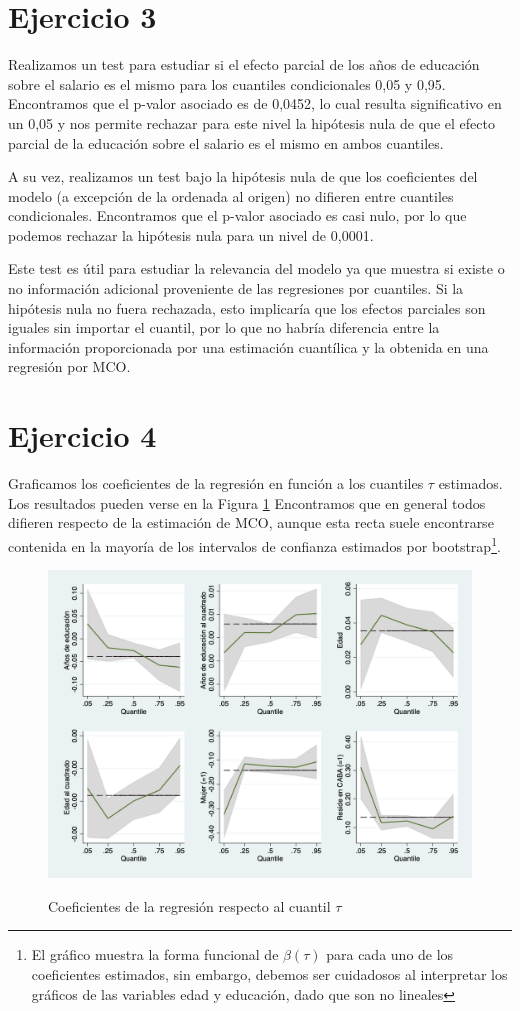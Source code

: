 \documentclass[11pt]{article}
\begin{document}
\section*{Ejercicio 3}

Realizamos un test para estudiar si el efecto parcial de los años de educación sobre el salario es el mismo para los cuantiles condicionales 0,05 y 0,95. Encontramos que el p-valor asociado es de 0,0452, lo cual resulta significativo en un 0,05 y nos permite rechazar para este nivel la hipótesis nula de que el efecto parcial de la educación sobre el salario es el mismo en ambos cuantiles.

A su vez, realizamos un test bajo la hipótesis nula de que los coeficientes del modelo (a excepción de la ordenada al origen) no difieren entre cuantiles condicionales. Encontramos que el p-valor asociado es casi nulo, por lo que podemos rechazar la hipótesis nula para un nivel de 0,0001. 

Este test es útil para estudiar la relevancia del modelo ya que muestra si existe o no información adicional proveniente de las regresiones por cuantiles. Si la hipótesis nula no fuera rechazada, esto implicaría que los efectos parciales son iguales sin importar el cuantil, por lo que no habría diferencia entre la información proporcionada por una estimación cuantílica y la obtenida en una regresión por MCO.

\section*{Ejercicio 4}

Graficamos los coeficientes de la regresión en función a los cuantiles $\tau$ estimados. Los resultados pueden verse en la Figura \ref{fig: 4} Encontramos que en general todos difieren respecto de la estimación de MCO, aunque esta recta suele encontrarse contenida en la mayoría de los intervalos de confianza estimados por bootstrap\footnote{El gráfico muestra la forma funcional de $\beta(\tau)$ para cada uno de los coeficientes estimados, sin embargo, debemos ser cuidadosos al interpretar los gráficos de las variables edad y educación, dado que son no lineales}.  

\begin{figure}[H]
	\caption{Coeficientes de la regresión respecto al cuantil $\tau$}
	\centering
	\includegraphics[width=0.8\linewidth]{4.png}
	\label{fig: 4}
\end{figure}
\end{document}
